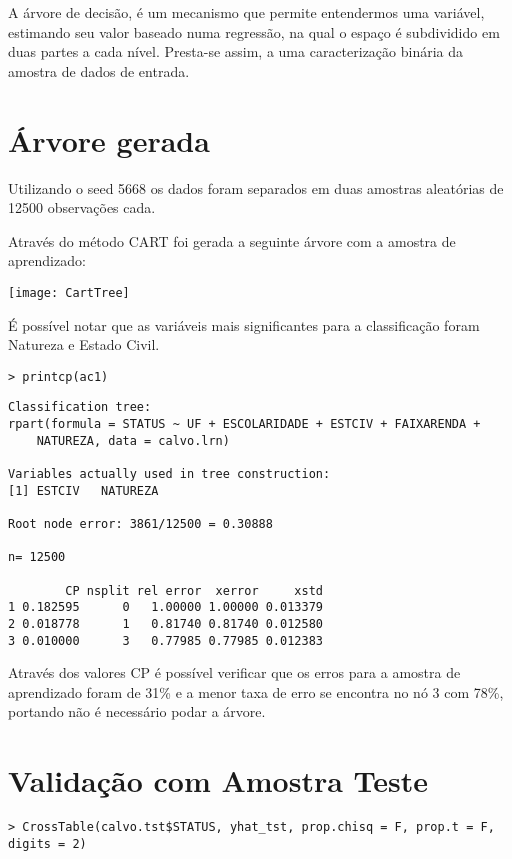 \label{chap:DecisionTree}A árvore de decisão, é um mecanismo que permite entendermos uma variável,
estimando seu valor baseado numa regressão, na qual o espaço é subdividido
em duas partes a cada nível. Presta-se assim, a uma caracterização
binária da amostra de dados de entrada.


\section{Árvore gerada}

Utilizando o seed 5668 os dados foram separados em duas amostras aleatórias
de 12500 observações cada.

Através do método CART foi gerada a seguinte árvore com a amostra
de aprendizado:

\begin{center}
\texttt{[image: CartTree]}
\par\end{center}

É possível notar que as variáveis mais significantes para a classificação
foram Natureza e Estado Civil. 

\begin{verbatim}
> printcp(ac1)
\end{verbatim}

\begin{lstlisting}
Classification tree:
rpart(formula = STATUS ~ UF + ESCOLARIDADE + ESTCIV + FAIXARENDA + 
    NATUREZA, data = calvo.lrn)
 
Variables actually used in tree construction:
[1] ESTCIV   NATUREZA
 
Root node error: 3861/12500 = 0.30888
 
n= 12500 
 
        CP nsplit rel error  xerror     xstd
1 0.182595      0   1.00000 1.00000 0.013379
2 0.018778      1   0.81740 0.81740 0.012580
3 0.010000      3   0.77985 0.77985 0.012383
\end{lstlisting}


Através dos valores CP é possível verificar que os erros para a amostra
de aprendizado foram de 31\% e a menor taxa de erro se encontra no
nó 3 com 78\%, portando não é necessário podar a árvore. 


\section{Validação com Amostra Teste}

\begin{verbatim}
> CrossTable(calvo.tst$STATUS, yhat_tst, prop.chisq = F, prop.t = F, digits = 2)
\end{verbatim}

